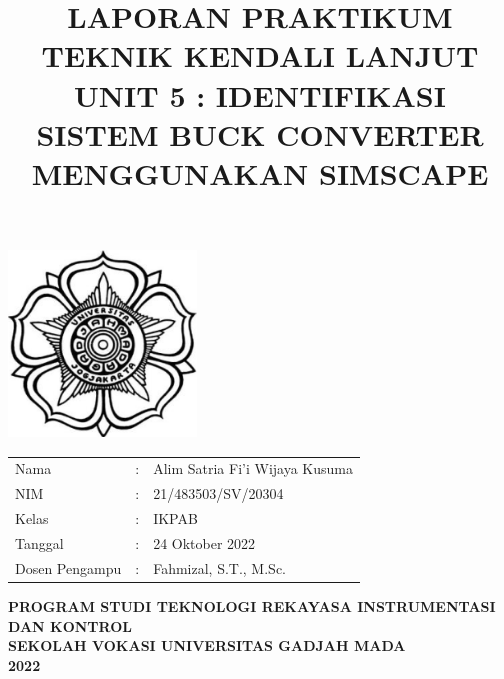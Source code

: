 \documentclass[12 pt]{article}
\title{\large \textbf{LAPORAN PRAKTIKUM TEKNIK KENDALI LANJUT} \\ \textbf{UNIT 5 : IDENTIFIKASI SISTEM BUCK CONVERTER MENGGUNAKAN SIMSCAPE}\linebreak}
\author{}
\date{}
\begin{document}
\clearpage
\maketitle
\thispagestyle{empty} %

\begin{center}
\includegraphics[width=5cm,height=5cm]{cover_laporan/logo_ugm.png}
\end{center}

\vspace{1 cm}

\begin{center}
\begin{tabular}{lcl}
Nama & : & Alim Satria Fi'i Wijaya Kusuma \\
NIM & : & 21/483503/SV/20304\\
Kelas & : & IKPAB\\
Tanggal & : & 24 Oktober 2022 \\
Dosen Pengampu & : & Fahmizal, S.T., M.Sc.
\end{tabular}
\newline
\newline
\newline
\newline
\large{\textbf{PROGRAM STUDI TEKNOLOGI REKAYASA INSTRUMENTASI DAN KONTROL}} \\
\textbf{SEKOLAH VOKASI UNIVERSITAS GADJAH MADA} \\
\textbf{2022}
\end{center}

\pagebreak
\tableofcontents
\pagebreak
\listoffigures
\pagebreak
\listoftables
\pagebreak


\end{document}
